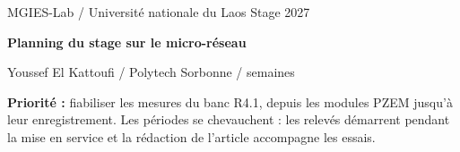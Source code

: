 \documentclass[11pt,a4paper]{article}
\begin{document}
{\small MGIES-Lab \enspace / \enspace Université nationale du Laos \hfill Stage 2027}\par
\vspace{4mm}
{\LARGE\bfseries\color{rougeCV} Planning du stage sur le micro-réseau}\par
\vspace{2mm}
Youssef El Kattoufi \enspace / \enspace Polytech Sorbonne \enspace /  semaines\par
\vspace{4mm}
\textbf{Priorité :} fiabiliser les mesures du banc R4.1, depuis les modules PZEM jusqu'à leur enregistrement. Les périodes se chevauchent : les relevés démarrent pendant la mise en service et la rédaction de l'article accompagne les essais.\par
\vspace{4mm}
\small
\end{document}

